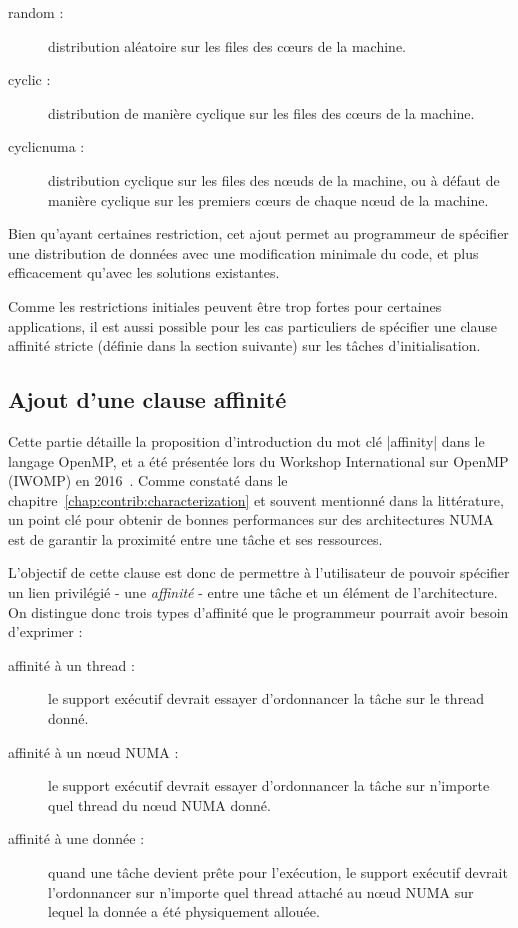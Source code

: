 \begin{description}
  \item [random :]
    distribution aléatoire sur les files des cœurs de la machine.
  \item [cyclic :]
    distribution de manière cyclique sur les files des cœurs de la machine.
  \item [cyclicnuma :]
    distribution cyclique sur les files des nœuds de la machine, ou à défaut de manière cyclique sur les premiers cœurs de chaque nœud de la machine.
\end{description}


Bien qu'ayant certaines restriction, cet ajout permet au programmeur de spécifier une distribution de données avec une modification minimale du code, et plus efficacement qu'avec les solutions existantes.

Comme les restrictions initiales peuvent être trop fortes pour certaines applications, il est aussi possible pour les cas particuliers de spécifier une clause affinité stricte (définie dans la section suivante) sur les tâches d'initialisation.



\subsection{Ajout d'une clause affinité}\label{sec:openmp:langage:affinity}

Cette partie détaille la proposition d'introduction du mot clé |affinity| dans le langage OpenMP, et a été présentée lors du Workshop International sur OpenMP (IWOMP) en 2016~\cite{Virouleau2016b}.
Comme constaté dans le chapitre~\ref{chap:contrib:characterization} et souvent mentionné dans la littérature, un point clé pour obtenir de bonnes performances sur des architectures NUMA est de garantir la proximité entre une tâche et ses ressources.

L'objectif de cette clause est donc de permettre à l'utilisateur de pouvoir spécifier un lien privilégié - une \emph{affinité} - entre une tâche et un élément de l'architecture.
On distingue donc trois types d'affinité que le programmeur pourrait avoir besoin d'exprimer :

\begin{description}
    \item [affinité à un thread :]
      le support exécutif devrait essayer d'ordonnancer la tâche sur le thread donné.
    \item [affinité à un nœud NUMA :]
      le support exécutif devrait essayer d'ordonnancer la tâche sur n'importe
      quel thread du nœud NUMA donné.

    \item [affinité à une donnée :]
      quand une tâche devient prête pour l'exécution, le support exécutif devrait
      l'ordonnancer sur n'importe quel thread attaché au nœud NUMA sur lequel
      la donnée a été physiquement allouée.
\end{description}

